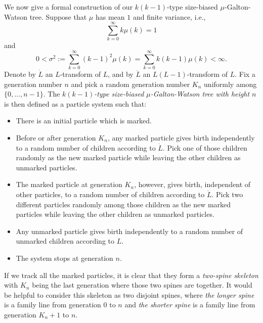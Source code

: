 \documentclass[UTF8]{pkuthss}
\theoremstyle{plain}
\theoremstyle{definition}
\numberwithin{equation}{section}
\begin{document}
We now give a formal construction of our $k(k-1)$-type size-biased $\mu$-Galton-Watson tree. 
Suppose that $\mu$ has mean $1$ and finite variance, i.e.,
\begin{equation}\label{eq:mean}
\sum_{k=0}^\infty k \mu(k)	=1
\end{equation}
and
\begin{equation}\label{eq:variance}
0	
<	\sigma^2
:=	\sum_{k=0}^\infty  (k-1)^2 \mu(k)
=	\sum_{k=0}^\infty k(k-1) \mu(k)
<	\infty.
\end{equation}
Denote by $\dot L$ an $L$-transform of $L$, and by $\ddot L$ an $L(L-1)$-transform of $L$.
Fix a generation number $n$ and pick a random generation number $K_n$ uniformly among $\{0,\dots,n-1\}$.
The \emph{$k(k-1)$-type size-biased $\mu$-Galton-Watson tree with height $n$} is then defined as a particle system such that:
\begin{itemize}
	\item
	There is an initial particle which is marked.
	\item
	Before or after generation $K_n$, any marked particle gives birth independently to a random number of children according to $\dot L$.
	Pick one of those children randomly as the new marked particle while leaving the other children as unmarked particles.
	\item
	The marked particle at generation $K_n$, however, gives birth, independent of other particles, to a random number of children according to $\ddot L$.
	Pick two different particles randomly among those children as the new marked particles while leaving the other children as unmarked particles.
	\item
	Any unmarked particle gives birth independently to a random number of unmarked children according to $L$.
	\item
	The system stops at generation $n$.
\end{itemize}

If we track all the marked particles, it is clear that they form a \emph{two-spine skeleton} with $K_n$ being the last generation where those two spines are together.
It would be helpful to consider this skeleton as two disjoint spines,
where \emph{the longer spine} is a family line from generation $0$ to $n$ and \emph{the shorter spine} is a family line from generation $K_n+1$ to $n$.
\end{document}

